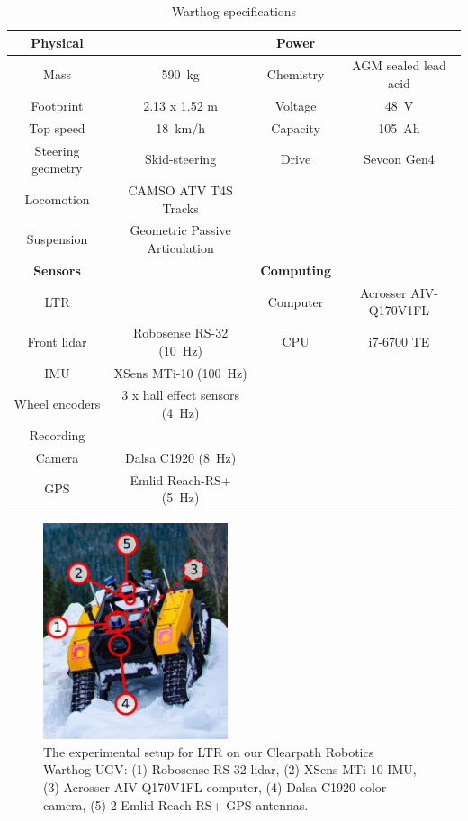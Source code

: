 \begin{table}[htpb]
	\caption{Warthog specifications} \label{tab:warthog_specs}
	\begin{center}
		\begin{tabular}{c c | c c}
			\textbf{Physical} &  & \textbf{Power} & \\
			\hline
			Mass & \SI{590}{kg} & Chemistry & AGM sealed lead acid \\ 
			Footprint & 2.13 x 1.52 m & Voltage & \SI{48}{V} \\ 
			Top speed & \SI{18}{km/h} & Capacity & \SI{105}{Ah} \\ 
			Steering geometry & Skid-steering  & Drive & Sevcon Gen4 \\
			Locomotion & CAMSO ATV T4S Tracks \\
			Suspension & Geometric Passive Articulation \\
			\hline
			\textbf{Sensors} & & \textbf{Computing} \\
			\hline
			\ac{LTR} & & Computer & Acrosser AIV-Q170V1FL  \\
			Front lidar & Robosense RS-32 (\SI{10}{Hz}) & CPU & i7-6700 TE \\
			\ac{IMU} & XSens MTi-10 (\SI{100}{Hz}) \\ 
			Wheel encoders & 3 x hall effect sensors (\SI{4}{Hz}) \\
			Recording & &   \\
			Camera & Dalsa C1920 (\SI{8}{Hz})  \\
			\ac{GPS} & Emlid Reach-RS+ (\SI{5}{Hz}) \\
			\hline
		\end{tabular}
	\end{center}
\end{table}

\begin{figure}
	\centering
	\includegraphics[height=2.5in]{figs/warthog_hardware.pdf}
	\caption{The experimental setup for \ac{LTR} on our Clearpath Robotics Warthog \ac{UGV}: (1) Robosense RS-32 lidar, (2) XSens MTi-10 \ac{IMU}, (3) Acrosser AIV-Q170V1FL computer, (4) Dalsa C1920 color camera, (5) 2 Emlid Reach-RS+ \ac{GPS} antennas.}
	\label{fig:warthog}
\end{figure}
